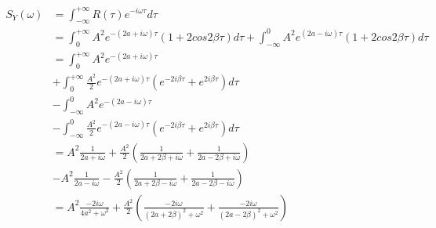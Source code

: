 \documentclass{article}
\begin{document}
\begin{align}\begin{split}
S_{Y}(\omega)&= \int^{+\infty}_{-\infty} R(\tau)e^{-i\omega\tau}d\tau \\
		     &= \int^{+\infty}_{0} A^{2}e^{-(2a+i\omega)\tau}(1 + 2cos2\beta\tau)d\tau
		     + \int^{0}_{-\infty} A^{2}e^{(2a-i\omega)\tau}(1 + 2cos2\beta\tau)d\tau\\
		     &= \int^{+\infty}_{0} A^{2}e^{-(2a+i\omega)\tau} \\
&+ \int^{+\infty}_{0}\frac{A^{2}}{2}e^{-(2a+i\omega)\tau}(e^{-2i\beta\tau} + e^{2i\beta\tau})d\tau\\
&- \int^{0}_{-\infty} A^{2}e^{-(2a-i\omega)\tau} \\
&- \int^{0}_{-\infty}\frac{A^{2}}{2} e^{-(2a-i\omega)\tau}(e^{-2i\beta\tau}+e^{2i\beta\tau})d\tau\\
		     &= A^{2}\frac{1}{2a+i\omega} 
		     + \frac{A^{2}}{2}(\frac{1}{2a+2\beta+i\omega} + \frac{1}{2a-2\beta+i\omega})\\
		     &- A^{2}\frac{1}{2a-i\omega} 
		     - \frac{A^{2}}{2}(\frac{1}{2a+2\beta-i\omega} + \frac{1}{2a-2\beta-i\omega})\\
		     &= A^{2}\frac{-2i\omega}{4a^{2}+\omega^{2}}
		     + \frac{A^{2}}{2}
		     (\frac{-2i\omega}{(2a + 2\beta)^{2}+\omega^{2}} + \frac{-2i\omega}{(2a - 2\beta)^{2}+\omega^{2}})
\end{split}\end{align}
\end{document}
